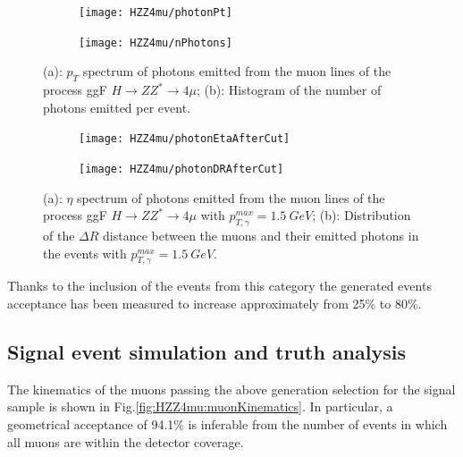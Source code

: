\documentclass[a4paper,twoside,12pt]{article}
\begin{document}
\begin{figure}
\centering
\begin{subfigure}{.5\textwidth}
  \centering
  \texttt{[image: HZZ4mu/photonPt]}
  \caption{}
  \label{fig:HZZ4mu:photonPt}
\end{subfigure}%
\begin{subfigure}{.5\textwidth}
  \centering
  \texttt{[image: HZZ4mu/nPhotons]}
  \caption{}
  \label{fig:HZZ4mu:nPhotons}
\end{subfigure}
\caption{(a): $p_T$ spectrum of photons emitted from the muon lines of the process 
	ggF $H \rightarrow ZZ^* \rightarrow 4\mu$; 
	(b): Histogram of the number of photons emitted per event.}
\label{fig:HZZ4mu:genPhotons}
\end{figure}

\begin{figure}
\centering
\begin{subfigure}{.5\textwidth}
  \centering
  \texttt{[image: HZZ4mu/photonEtaAfterCut]}
  \caption{}
  \label{fig:HZZ4mu:photonEtaAfterCut}
\end{subfigure}%
\begin{subfigure}{.5\textwidth}
  \centering
  \texttt{[image: HZZ4mu/photonDRAfterCut]}
  \caption{}
  \label{fig:HZZ4mu:photonDRAfterCut}
\end{subfigure}
\caption{(a): $\eta$ spectrum of photons emitted from the muon lines of the process 
	ggF $H \rightarrow ZZ^* \rightarrow 4\mu$ with $p^{max}_{T, \gamma} = 1.5\ GeV$; 
	(b): Distribution of the $\Delta R$ distance between the muons and their emitted photons in the events with $p^{max}_{T, \gamma} = 1.5\ GeV$.}
\label{fig:HZZ4mu:genPhotonsAfterCut}
\end{figure}

Thanks to the inclusion of the events from this category the generated events acceptance has been measured to increase approximately from 25\% to 80\%.\\

\subsection{Signal event simulation and truth analysis}

The kinematics of the muons passing the above generation selection for the 
signal sample is shown in 
Fig.\ref{fig:HZZ4mu:muonKinematics}. In particular, a geometrical acceptance of 94.1\%
is inferable from the number of events in which all muons are within the detector
coverage.\\
\end{document}
